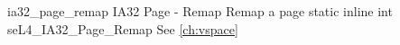 %
%
%
%

\apidoc
{ia32_page_remap}
{IA32 Page - Remap}
{Remap a page}
{static inline int seL4\_IA32\_Page\_Remap }
{
}
{\errorenumdesc}
{See \autoref{ch:vspace}}
